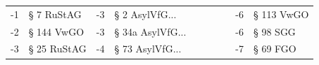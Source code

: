 \begin{tabular}{rlrlllllrl}
        -1 &        § 7 RuStAG &          -3 &    § 2 AsylVfG... &            &               &            &                     &         -6 &          § 113 VwGO \\
        -2 &        § 144 VwGO &          -3 &  § 34a AsylVfG... &            &               &            &                     &         -6 &            § 98 SGG \\
        -3 &       § 25 RuStAG &          -4 &   § 73 AsylVfG... &            &               &            &                     &         -7 &            § 69 FGO \\
\bottomrule
\end{tabular}

\